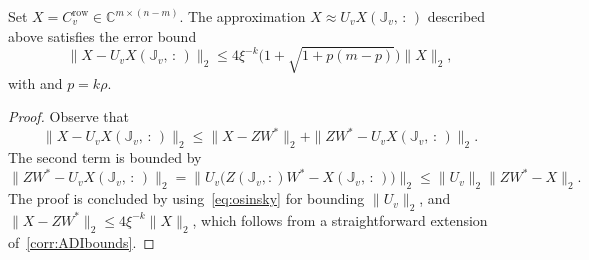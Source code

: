 \documentclass[10pt,a4paper]{amsart}
\newcommand{\C}{\mathbb{C}}
\begin{document}
\begin{lemma} 
\label{lemma:int_decomp_error_leaf}
Set $X = C_v^{\mathrm{row}} \in \C^{m \times (n-m)}$.
The approximation $X \approx U_v X(\mathbb{J}_v, \, : \,)$ described above satisfies the error bound
\begin{equation} 
\label{eq:HSS_fadi_error}
\|X - U_v X(\mathbb{J}_v, \, : \,)\|_2 \leq 4 \xi^{-k} \big( 1 + \sqrt{1+p(m-p)}\big) \|X\|_2,
\end{equation}
with  and $p = k \rho$.
\end{lemma}

\begin{proof}
Observe that
$$ \|X - U_v X(\mathbb{J}_v, \, : \,)\|_2 \leq  \|X - ZW^*\|_2 + \|ZW^* - U_v X(\mathbb{J}_v, \, : \,)\|_2.$$
The second term is bounded by
\[
 \|ZW^* - U_v X(\mathbb{J}_v, \, : \,)\|_2
 = \big\|
 U_v \big(
 Z(\mathbb J_v,:) W^* - X(\mathbb{J}_v, \, : \,)
 \big) 
 \big\|_2 \le \|U_v\|_2\|  ZW^* - X  \|_2.
\]
The proof is concluded by using~\eqref{eq:osinsky} for bounding $\|U_v\|_2$, and $\|X - ZW^*\|_2 \leq 4 \xi^{-k} \|X\|_2$,
which follows from a straightforward extension of~\cref{corr:ADIbounds}.
\end{proof}
\end{document}
